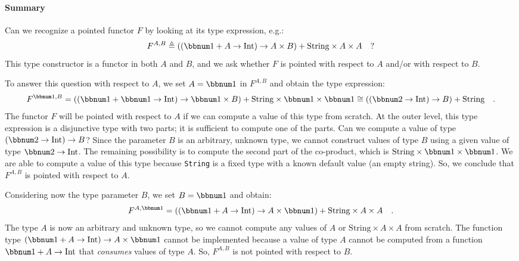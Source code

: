 \paragraph{Summary}

Can we recognize a pointed functor $F$ by looking at its type expression,
e.g.:
\[
F^{A,B}\triangleq\left((\bbnum 1+A\rightarrow\text{Int})\rightarrow A\times B\right)+\text{String}\times A\times A\quad?
\]
This type constructor is a functor in both $A$ and $B$, and we ask
whether $F$ is pointed with respect to $A$ and/or with respect to
$B$.

To answer this question with respect to $A$, we set $A=\bbnum 1$
in $F^{A,B}$ and obtain the type expression:
\[
F^{\bbnum 1,B}=\left((\bbnum 1+\bbnum 1\rightarrow\text{Int})\rightarrow\bbnum 1\times B\right)+\text{String}\times\bbnum 1\times\bbnum 1\cong\left(\left(\bbnum 2\rightarrow\text{Int}\right)\rightarrow B\right)+\text{String}\quad.
\]
The functor $F$ will be pointed with respect to $A$ if we can compute
a value of this type from scratch. At the outer level, this type expression
is a disjunctive type with two parts; it is sufficient to compute
one of the parts. Can we compute a value of type $\left(\bbnum 2\rightarrow\text{Int}\right)\rightarrow B$?
Since the parameter $B$ is an arbitrary, unknown type, we cannot
construct values of type $B$ using a given value of type $\bbnum 2\rightarrow\text{Int}$.
The remaining possibility is to compute the second part of the co-product,
which is $\text{String}\times\bbnum 1\times\bbnum 1$. We are able
to compute a value of this type because \lstinline!String! is a fixed
type with a known default value (an empty string). So, we conclude
that $F^{A,B}$ is pointed with respect to $A$.

Considering now the type parameter $B$, we set $B=\bbnum 1$ and
obtain:
\[
F^{A,\bbnum 1}=\left((\bbnum 1+A\rightarrow\text{Int})\rightarrow A\times\bbnum 1\right)+\text{String}\times A\times A\quad.
\]
The type $A$ is now an arbitrary and unknown type, so we cannot compute
any values of $A$ or $\text{String}\times A\times A$ from scratch.
The function type $(\bbnum 1+A\rightarrow\text{Int})\rightarrow A\times\bbnum 1$
cannot be implemented because a value of type $A$ cannot be computed
from a function $\bbnum 1+A\rightarrow\text{Int}$ that \emph{consumes}
values of type $A$. So, $F^{A,B}$ is not pointed with respect to
$B$.

